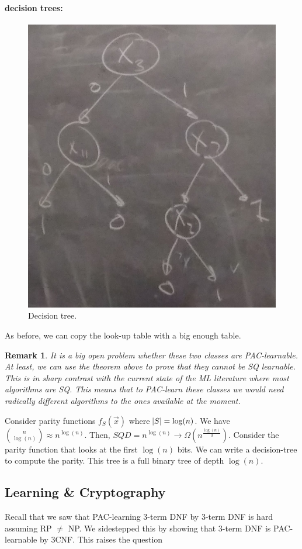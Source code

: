 \documentclass[12pt, letterpaper]{article}
\numberwithin{equation}{section} %
\newtheorem{remark}[theorem]{Remark}
\theoremstyle{definition}
\theoremstyle{remark}
\begin{document}
\paragraph{decision trees:}
\begin{figure}[H]
\centering
\includegraphics[width=0.6\linewidth]{img/tree}
\caption{Decision tree.}
\end{figure}
As before, we can copy the look-up table with a big enough table.

\begin{remark}
It is a big open problem whether these two classes are PAC-learnable. At least, we can use the theorem above to prove that they cannot be SQ learnable. This is in sharp contrast with the current state of the ML literature where most algorithms are SQ. This means that to PAC-learn these classes we would need radically different algorithms to the ones available at the moment.
\end{remark}

Consider parity functions $f_S(\vec x)$ where $\abs{S} = \log(n)$. We have $\binom{n}{\log (n)} \approx n^{\log(n)}$. Then, $SQD = n^{\log(n)} \rightarrow \Omega(n^{\frac{\log(n)}3})$. Consider the parity function that looks at the first $\log(n)$ bits. We can write a decision-tree to compute the parity.  This tree is a full binary tree of depth $\log(n)$.

\subsection{Learning \& Cryptography}
Recall that we saw that PAC-learning 3-term DNF by 3-term DNF is hard assuming RP $\ne$ NP. We sidestepped this by showing that 3-term DNF is PAC-learnable by 3CNF. This raises the question
\end{document}

